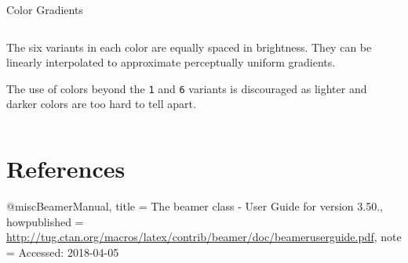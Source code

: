 \documentclass[aspectratio=169,colorblocks,darkmode]{beamer}
\begin{document}
\begin{frame}{Color Gradients}

\begin{columns}
    \begin{column}{.49\textwidth}
    The six variants in each color are equally spaced in brightness. They can be linearly interpolated to approximate perceptually uniform gradients. 
    \vspace{1em}
    
    The use of colors beyond the \texttt{1} and \texttt{6} variants is discouraged as lighter and darker colors are too hard to tell apart.
    \end{column}

    \begin{column}{.49\textwidth}
        \begin{center}
        \end{center}
    \end{column}
\end{columns}
\end{frame}


\section*{References}
\begin{frame}[allowframebreaks]
  
	\begin{thebibliography}
    @misc{BeamerManual,
      title = {{The beamer class} - User Guide for version 3.50.},
      howpublished = {\url{http://tug.ctan.org/macros/latex/contrib/beamer/doc/beameruserguide.pdf}},
      note = {Accessed: 2018-04-05}
    }
  \end{thebibliography}
\end{frame}
\end{document}
